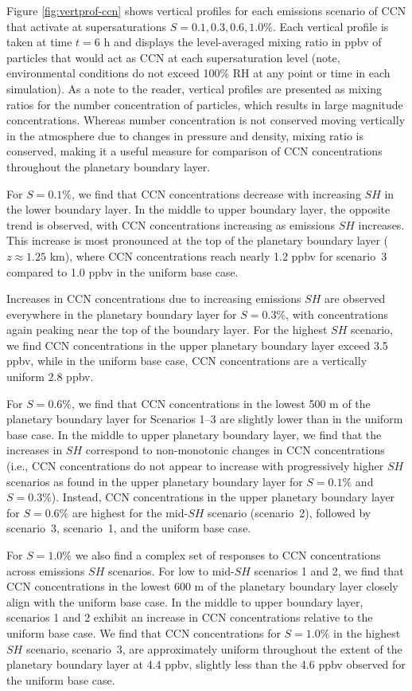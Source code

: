 Figure \ref{fig:vertprof-ccn} shows vertical profiles for each emissions scenario of CCN that activate at supersaturations $S=0.1, 0.3, 0.6, 1.0\%$. Each vertical profile is taken at time $t=6$ h and displays the level-averaged mixing ratio in ppbv of particles that would act as CCN at each supersaturation level (note, environmental conditions do not exceed 100\% RH at any point or time in each simulation). As a note to the reader, vertical profiles are presented as mixing ratios for the number concentration of particles, which results in large magnitude concentrations. Whereas number concentration is not conserved moving vertically in the atmosphere due to changes in pressure and density, mixing ratio is conserved, making it a useful measure for comparison of CCN concentrations throughout the planetary boundary layer. 

For $S=0.1\%$, we find that CCN concentrations decrease with increasing $SH$ in the lower boundary layer. In the middle to upper boundary layer, the opposite trend is observed, with CCN concentrations increasing as emissions $SH$ increases. This increase is most pronounced at the top of the planetary boundary layer ($z\approx 1.25$ km), where CCN concentrations reach nearly 1.2 ppbv for scenario~3 compared to 1.0 ppbv in the uniform base case. 

Increases in CCN concentrations due to increasing emissions $SH$ are observed everywhere in the planetary boundary layer for $S=0.3\%$, with concentrations again peaking near the top of the boundary layer. For the highest $SH$ scenario, we find CCN concentrations in the upper planetary boundary layer exceed 3.5 ppbv, while in the uniform base case, CCN concentrations are a vertically uniform 2.8 ppbv. 

For $S=0.6\%$, we find that CCN concentrations in the lowest 500 m of the planetary boundary layer for Scenarios 1--3 are slightly lower than in the uniform base case. In the middle to upper planetary boundary layer, we find that the increases in $SH$ correspond to non-monotonic changes in CCN concentrations (i.e., CCN concentrations do not appear to increase with progressively higher $SH$ scenarios as found in the upper planetary boundary layer for $S=0.1\%$ and $S=0.3\%$). Instead, CCN concentrations in the upper planetary boundary layer for $S=0.6\%$ are highest for the mid-$SH$ scenario (scenario~2), followed by scenario~3, scenario~1, and the uniform base case. 

For $S=1.0\%$ we also find a complex set of responses to CCN concentrations across emissions $SH$ scenarios. For low to mid-$SH$ scenarios 1 and 2, we find that CCN concentrations in the lowest $600$ m of the planetary boundary layer closely align with the uniform base case. In the middle to upper boundary layer, scenarios 1 and 2 exhibit an increase in CCN concentrations relative to the uniform base case. We find that CCN concentrations for $S=1.0\%$ in the highest $SH$ scenario, scenario~3, are approximately uniform throughout the extent of the planetary boundary layer at 4.4 ppbv, slightly less than the 4.6 ppbv observed for the uniform base case. 

